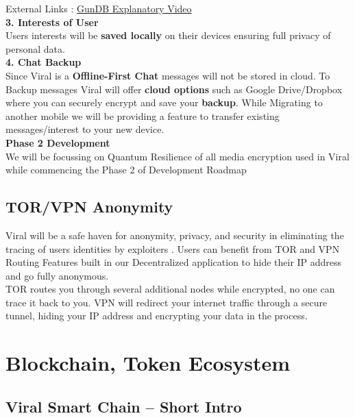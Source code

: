 \documentclass[10pt]{article}
\begin{document}
External Links : \hyperlink{https://youtu.be/-SiLnaSDkh4}{GunDB Explanatory Video}\\

\textbf{3. Interests of User}\\

Users\textsc{} interests will be \textbf{saved locally} on their devices ensuring full privacy of personal data.\\

\textbf{4. Chat Backup}\\

Since Viral is a \textbf{Offline-First Chat} messages will not be stored in cloud. To Backup messages Viral will offer \textbf{cloud options} such as Google Drive/Dropbox where you can securely encrypt and save your \textbf{backup}. While Migrating to another mobile we will be providing a feature to transfer existing messages/interest to your new device.\\

\textbf{Phase 2 Development}\\

We will be focussing on Quantum Resilience of all media encryption used in Viral while commencing the Phase 2 of Development Roadmap\\

\subsection{TOR/VPN Anonymity}

Viral will be a safe haven for anonymity, privacy, and security in eliminating the tracing of users\textsc{} identities by exploiters . Users can benefit from TOR and VPN Routing Features built in our Decentralized application to hide their IP address and go fully anonymous.\\

TOR routes you through several additional nodes while encrypted, no one can trace it back to you. VPN will redirect your internet traffic through a secure tunnel, hiding your IP address and encrypting your data in the process.\\


\newpage

\section{Blockchain, Token Ecosystem}

\subsection{Viral Smart Chain – Short Intro}
\end{document}
